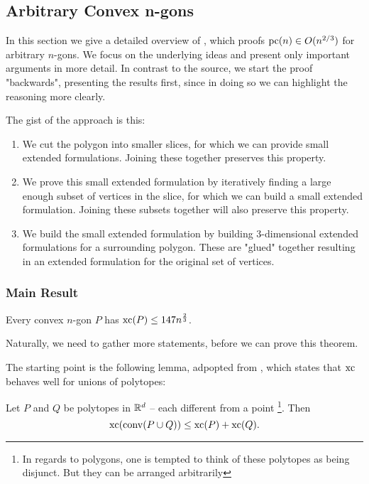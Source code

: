 \subsection{Arbitrary Convex n-gons}

In this section we give a detailed overview of \cite{shitov2020sublinear}, which proofs $\operatorname{pc}(n) \in O(n^{2/3})$ for arbitrary $n$-gons. 
We focus on the underlying ideas and present only important arguments in more detail. In contrast to the source, we start the proof "backwards", presenting  the results first, since in doing so we can highlight the reasoning more clearly.

The gist of the approach is this: 
\begin{enumerate}
  \item We cut the polygon into smaller slices, for which we can provide small extended formulations. Joining these together preserves this property.
  \item We prove this small extended formulation by iteratively finding a large enough subset of vertices in the slice, for which we can build a small extended formulation. Joining these subsets together will also preserve this property.
  \item We build the small extended formulation by building 3-dimensional extended formulations for a surrounding polygon. These are "glued" together resulting in an extended formulation for the original set of vertices.
\end{enumerate}



\subsubsection{Main Result}

\begin{theorem}\label{theorem:xc}
  Every convex $n$-gon $P$ has $\operatorname{xc}(P) \leq 147 n^{\frac{2}{3}}$.
\end{theorem}

Naturally, we need to gather more statements, before we can prove this theorem. 

The starting point is the following lemma, adpopted from \cite[Proposition 3.1.1]{weltge2015sizes}, which states that $\operatorname{xc}$ behaves well for unions of polytopes:
\begin{lemma}\label{lemma:union}
  Let $P$ and $Q$ be polytopes in $\mathbb{R}^d$ -- each different from a point \footnote{In regards to polygons, one is tempted to think of these polytopes as being disjunct. But they can be arranged arbitrarily}. Then $$\operatorname{xc}(\operatorname{conv}(P \cup Q)) \leq \operatorname{xc}(P) + \operatorname{xc}(Q) .$$
\end{lemma}

